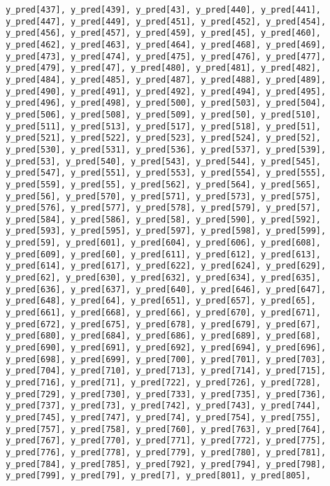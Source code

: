 \documentclass[
  letterpaper,
  DIV=11,
  numbers=noendperiod]{scrartcl}
\begin{document}
\begin{verbatim}
y_pred[437], y_pred[439], y_pred[43], y_pred[440], y_pred[441],
y_pred[447], y_pred[449], y_pred[451], y_pred[452], y_pred[454],
y_pred[456], y_pred[457], y_pred[459], y_pred[45], y_pred[460],
y_pred[462], y_pred[463], y_pred[464], y_pred[468], y_pred[469],
y_pred[473], y_pred[474], y_pred[475], y_pred[476], y_pred[477],
y_pred[479], y_pred[47], y_pred[480], y_pred[481], y_pred[482],
y_pred[484], y_pred[485], y_pred[487], y_pred[488], y_pred[489],
y_pred[490], y_pred[491], y_pred[492], y_pred[494], y_pred[495],
y_pred[496], y_pred[498], y_pred[500], y_pred[503], y_pred[504],
y_pred[506], y_pred[508], y_pred[509], y_pred[50], y_pred[510],
y_pred[511], y_pred[513], y_pred[517], y_pred[518], y_pred[51],
y_pred[521], y_pred[522], y_pred[523], y_pred[524], y_pred[52],
y_pred[530], y_pred[531], y_pred[536], y_pred[537], y_pred[539],
y_pred[53], y_pred[540], y_pred[543], y_pred[544], y_pred[545],
y_pred[547], y_pred[551], y_pred[553], y_pred[554], y_pred[555],
y_pred[559], y_pred[55], y_pred[562], y_pred[564], y_pred[565],
y_pred[56], y_pred[570], y_pred[571], y_pred[573], y_pred[575],
y_pred[576], y_pred[577], y_pred[578], y_pred[579], y_pred[57],
y_pred[584], y_pred[586], y_pred[58], y_pred[590], y_pred[592],
y_pred[593], y_pred[595], y_pred[597], y_pred[598], y_pred[599],
y_pred[59], y_pred[601], y_pred[604], y_pred[606], y_pred[608],
y_pred[609], y_pred[60], y_pred[611], y_pred[612], y_pred[613],
y_pred[614], y_pred[617], y_pred[622], y_pred[624], y_pred[629],
y_pred[62], y_pred[630], y_pred[632], y_pred[634], y_pred[635],
y_pred[636], y_pred[637], y_pred[640], y_pred[646], y_pred[647],
y_pred[648], y_pred[64], y_pred[651], y_pred[657], y_pred[65],
y_pred[661], y_pred[668], y_pred[66], y_pred[670], y_pred[671],
y_pred[672], y_pred[675], y_pred[678], y_pred[679], y_pred[67],
y_pred[680], y_pred[684], y_pred[686], y_pred[689], y_pred[68],
y_pred[690], y_pred[691], y_pred[692], y_pred[694], y_pred[696],
y_pred[698], y_pred[699], y_pred[700], y_pred[701], y_pred[703],
y_pred[704], y_pred[710], y_pred[713], y_pred[714], y_pred[715],
y_pred[716], y_pred[71], y_pred[722], y_pred[726], y_pred[728],
y_pred[729], y_pred[730], y_pred[733], y_pred[735], y_pred[736],
y_pred[737], y_pred[73], y_pred[742], y_pred[743], y_pred[744],
y_pred[745], y_pred[747], y_pred[74], y_pred[754], y_pred[755],
y_pred[757], y_pred[758], y_pred[760], y_pred[763], y_pred[764],
y_pred[767], y_pred[770], y_pred[771], y_pred[772], y_pred[775],
y_pred[776], y_pred[778], y_pred[779], y_pred[780], y_pred[781],
y_pred[784], y_pred[785], y_pred[792], y_pred[794], y_pred[798],
y_pred[799], y_pred[79], y_pred[7], y_pred[801], y_pred[805],

\end{verbatim}
\end{document}

